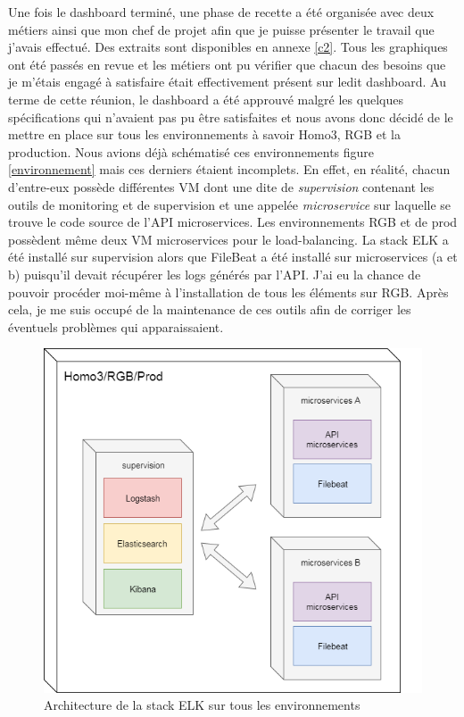 	Une fois le dashboard terminé, une phase de recette a été organisée avec deux métiers ainsi que mon chef de projet afin que je puisse présenter le travail que j'avais effectué. Des extraits sont disponibles en annexe \ref{c2}. Tous les graphiques ont été passés en revue et les métiers ont pu vérifier que chacun des besoins que je m'étais engagé à satisfaire était effectivement présent sur ledit dashboard. Au terme de cette réunion, le dashboard a été approuvé malgré les quelques spécifications qui n'avaient pas pu être satisfaites et nous avons donc décidé de le mettre en place sur tous les environnements à savoir Homo3, RGB et la production. Nous avions déjà schématisé ces environnements figure \ref{environnement} mais ces derniers étaient incomplets. En effet, en réalité, chacun d'entre-eux possède différentes VM dont une dite de \textit{supervision} contenant les outils de monitoring et de supervision et une appelée \textit{microservice} sur laquelle se trouve le code source de l'API microservices. Les environnements RGB et de prod possèdent même deux VM microservices pour le load-balancing. La stack ELK a été installé sur supervision alors que FileBeat a été installé sur microservices (a et b) puisqu'il devait récupérer les logs générés par l'API. J'ai eu la chance de pouvoir procéder moi-même à l'installation de tous les éléments sur RGB. Après cela, je me suis occupé de la maintenance de ces outils afin de corriger les éventuels problèmes qui apparaissaient.\\
	
\begin{figure}[h!]
	\includegraphics[scale=0.45]{images/travailNeuflizeOBC/dashboard/elkDeploiement.png}
	\centering
	\caption{Architecture de la stack ELK sur tous les environnements}
	\label{elkDeploiement}
\end{figure}

